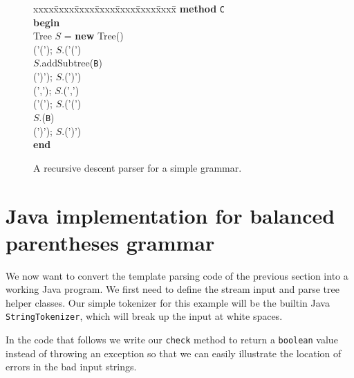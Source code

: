 \begin{figure}[p]
\begin{minipage}{5in}
\begin{tabbing}
xxxx\=xxxx\=xxxx\=xxxx\=xxxx\=xxxx\=xxxx\= \kill
\textbf{method} \texttt{C}\\ 
\textbf{begin} \\
\> Tree $S$ = \textbf{new} Tree()\\
\> ('('); $S$.('(')\\
\> $S$.addSubtree(\texttt{B})\\
\> (')'); $S$.(')')\\
\> (','); $S$.(',')\\
\> ('('); $S$.('(')\\
\> $S$.(\texttt{B})\\
\> (')'); $S$.(')')\\
\textbf{end} 
\end{tabbing}
\end{minipage}
\caption{A recursive descent parser for a simple grammar.} \label{fig:parsing}
\end{figure}

\section{Java implementation for balanced parentheses grammar}

We now want to convert the template parsing code of the previous section
into a working Java program.  We first need to define the stream input
and parse tree helper classes.  Our simple tokenizer for this example
will be the builtin Java \verb|StringTokenizer|, which will break
up the input at white spaces.  

In the code that follows 
we write our \verb|check| method to return a \verb|boolean| value
instead of throwing an exception so that we can easily illustrate
the location of errors in the bad input strings.  

